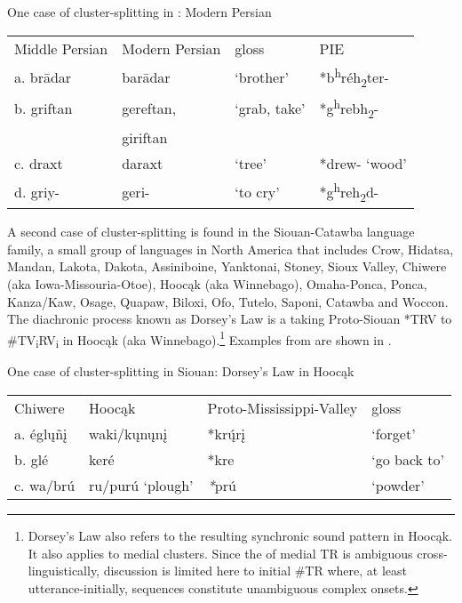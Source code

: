 \documentclass[output=paper,
modfonts
]{LSP/langsci}
\begin{document}
\ea \label{ex:blevins:5} One case of cluster-splitting  in : Modern Persian 
\begin{table}
\begin{tabular}{llll}
Middle Persian & Modern Persian & gloss & PIE\\
a. brādar  & barādar & `brother' & *b\textsuperscript{h}réh\textsubscript{2}ter- \\

b. griftan & gereftan, & `grab, take' &  *g\textsuperscript{h}rebh\textsubscript{2}- \\
 & giriftan & & \\

c. draxt & daraxt  & `tree' &  *drew- `wood' \\

d. griy- & geri- & `to cry' & *g\textsuperscript{h}reh\textsubscript{2}d- \\
\end{tabular}
\end{table}
\z

A second case of cluster-splitting   is found in
the Siouan-Catawba language family, a small group of languages in North
America that includes Crow, Hidatsa, Mandan, Lakota, Dakota,
Assiniboine, Yanktonai, Stoney, Sioux Valley, Chiwere (aka
Iowa-Missouria-Otoe), Hoocąk (aka Winnebago), Omaha-Ponca, Ponca,
Kanza/Kaw, Osage, Quapaw, Biloxi, Ofo, Tutelo, Saponi, Catawba and
Woccon. The diachronic process known as Dorsey's Law \citep{dorsey1885a} is a
 taking Proto-Siouan *TRV to
\#TV\textsubscript{i}RV\textsubscript{i} in Hoocąk (aka
Winnebago).\footnote{Dorsey's Law also refers to the resulting
  synchronic sound pattern in Hoocąk. It also applies to medial
  clusters. Since the  of medial TR is ambiguous
  cross-linguistically, discussion is limited here to initial \#TR
  where, at least utterance-initially, sequences constitute unambiguous
  complex onsets.} Examples from \citet{rankin2015a} are shown in .

\begin{exe} \label{ex:blevins:6}
\ex One case of cluster-splitting  in Siouan: Dorsey's Law in
Hoocąk
\begin{table}
\begin{tabular}{llll}
Chiwere & Hoocąk & Proto-Mississippi-Valley &  gloss\\

a. églųñį & waki/kųnųnį & *krų́rį & `forget' \\

b. glé & keré & *kre & `go back to' \\

c. wa/brú & ru/purú `plough' & \emph{*}prú & `powder' \\
\end{tabular}
\end{table}
\end{exe}
\end{document}
